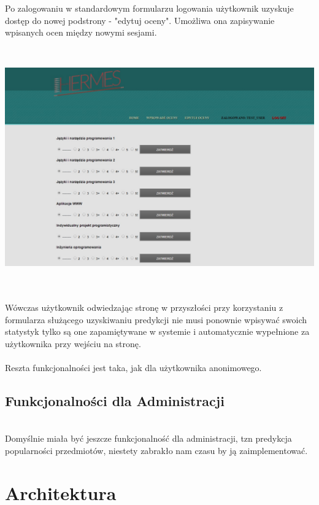 \documentclass[licencjacka]{pracamgr}
\begin{document}
\newpage 
Po zalogowaniu w standardowym formularzu logowania użytkownik uzyskuje dostęp
do nowej podstrony - "edytuj oceny". Umożliwa ona zapisywanie wpisanych ocen między
nowymi sesjami. \par ~\\

\begin{minipage}{\linewidth}
	\centering
           \includegraphics[scale=0.5]{registeredUserEdit.jpg}
\end{minipage} \\ ~\\

Wówczas użytkownik odwiedzając stronę w przyszłości 
przy korzystaniu z formularza służącego uzyskiwaniu predykcji nie musi ponownie
wpisywać swoich statystyk tylko są one zapamiętywane w systemie i automatycznie wypełnione za użytkownika
przy wejściu na stronę. \\ \\

Reszta funkcjonalności jest taka, jak dla użytkownika anonimowego.

\section{Funkcjonalności dla Administracji}
~\\ \indent
Domyślnie miała być jeszcze funkcjonalność dla administracji, tzn predykcja popularności przedmiotów, niestety zabrakło nam czasu by ją zaimplementować.
 

\chapter{Architektura} 
\end{document}
